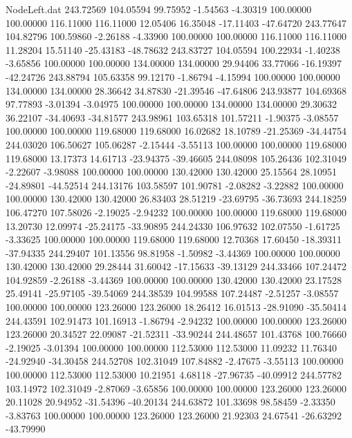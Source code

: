 \begin{filecontents}{NodeLeft.dat}
 243.72569  104.05594   99.75952    -1.54563   -4.30319  100.00000  100.00000  116.11000  116.11000   12.05406   16.35048  -17.11403  -47.64720
 243.77647  104.82796  100.59860    -2.26188   -4.33900  100.00000  100.00000  116.11000  116.11000   11.28204   15.51140  -25.43183  -48.78632
 243.83727  104.05594  100.22934    -1.40238   -3.65856  100.00000  100.00000  134.00000  134.00000   29.94406   33.77066  -16.19397  -42.24726
 243.88794  105.63358   99.12170    -1.86794   -4.15994  100.00000  100.00000  134.00000  134.00000   28.36642   34.87830  -21.39546  -47.64806
 243.93877  104.69368   97.77893    -3.01394   -3.04975  100.00000  100.00000  134.00000  134.00000   29.30632   36.22107  -34.40693  -34.81577
 243.98961  103.65318  101.57211    -1.90375   -3.08557  100.00000  100.00000  119.68000  119.68000   16.02682   18.10789  -21.25369  -34.44754
 244.03020  106.50627  105.06287    -2.15444   -3.55113  100.00000  100.00000  119.68000  119.68000   13.17373   14.61713  -23.94375  -39.46605
 244.08098  105.26436  102.31049    -2.22607   -3.98088  100.00000  100.00000  130.42000  130.42000   25.15564   28.10951  -24.89801  -44.52514
 244.13176  103.58597  101.90781    -2.08282   -3.22882  100.00000  100.00000  130.42000  130.42000   26.83403   28.51219  -23.69795  -36.73693
 244.18259  106.47270  107.58026    -2.19025   -2.94232  100.00000  100.00000  119.68000  119.68000   13.20730   12.09974  -25.24175  -33.90895
 244.24330  106.97632  102.07550    -1.61725   -3.33625  100.00000  100.00000  119.68000  119.68000   12.70368   17.60450  -18.39311  -37.94335
 244.29407  101.13556   98.81958    -1.50982   -3.44369  100.00000  100.00000  130.42000  130.42000   29.28444   31.60042  -17.15633  -39.13129
 244.33466  107.24472  104.92859    -2.26188   -3.44369  100.00000  100.00000  130.42000  130.42000   23.17528   25.49141  -25.97105  -39.54069
 244.38539  104.99588  107.24487    -2.51257   -3.08557  100.00000  100.00000  123.26000  123.26000   18.26412   16.01513  -28.91090  -35.50414
 244.43591  102.91473  101.16913    -1.86794   -2.94232  100.00000  100.00000  123.26000  123.26000   20.34527   22.09087  -21.52311  -33.90244
 244.48657  101.43768  100.76660    -2.19025   -3.01394  100.00000  100.00000  112.53000  112.53000   11.09232   11.76340  -24.92940  -34.30458
 244.52708  102.31049  107.84882    -2.47675   -3.55113  100.00000  100.00000  112.53000  112.53000   10.21951    4.68118  -27.96735  -40.09912
 244.57782  103.14972  102.31049    -2.87069   -3.65856  100.00000  100.00000  123.26000  123.26000   20.11028   20.94952  -31.54396  -40.20134
 244.63872  101.33698   98.58459    -2.33350   -3.83763  100.00000  100.00000  123.26000  123.26000   21.92303   24.67541  -26.63292  -43.79990

\end{filecontents}
